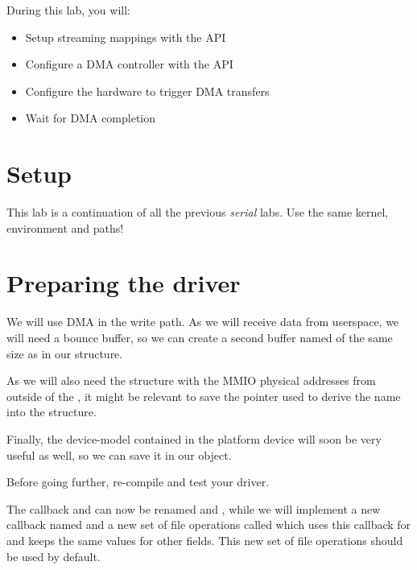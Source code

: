 
During this lab, you will:

\begin{itemize}
\item Setup streaming mappings with the  API
\item Configure a DMA controller with the  API
\item Configure the hardware to trigger DMA transfers
\item Wait for DMA completion
\end{itemize}

\section{Setup}

This lab is a continuation of all the previous {\em serial} labs. Use
the same kernel, environment and paths!

\section{Preparing the driver}

We will use DMA in the write path. As we will receive data from
userspace, we will need a bounce buffer, so we can create a second
buffer named  of the same size as  in our
 structure.

As we will also need the  structure with the MMIO physical
addresses from outside of the , it might be relevant to save
the  pointer used to derive the  name into the
 structure.

Finally, the device-model  contained in the
platform device will soon be very useful as well, so we can save it in
our  object.

Before going further, re-compile and test your driver.

The  callback and  can now be
renamed  and , while we will
implement a new callback named  and a new set of file
operations called  which uses this callback
for  and keeps the same values for other fields. This new set of
file operations should be used by default.

